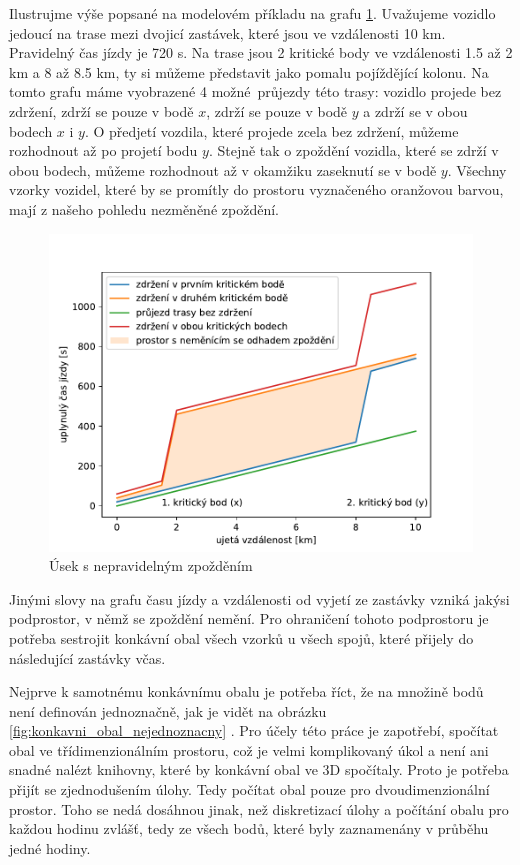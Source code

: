 \bigbreak

Ilustrujme výše popsané na modelovém příkladu na grafu \ref{fig:concave_hull}. Uvažujeme vozidlo jedoucí na trase mezi dvojicí zastávek, které jsou ve vzdálenosti 10 km. Pravidelný čas jízdy je 720 s. Na trase jsou 2 kritické body ve vzdálenosti 1.5 až 2 km a 8 až 8.5 km, ty si můžeme představit jako pomalu pojíždějící kolonu. Na tomto grafu máme vyobrazené 4 možné průjezdy této trasy: vozidlo projede bez zdržení, zdrží se pouze v bodě $x$, zdrží se pouze v bodě $y$ a zdrží se v obou bodech $x$ i $y$. O předjetí vozdila, které projede zcela bez zdržení, můžeme rozhodnout až po projetí bodu $y$. Stejně tak o zpoždění vozidla, které se zdrží v obou bodech, můžeme rozhodnout až v okamžiku zaseknutí se v bodě $y$. Všechny vzorky vozidel, které by se promítly do prostoru vyznačeného oranžovou barvou, mají z našeho pohledu nezměněné zpoždění.


\begin{figure}
\centering
  \includegraphics[width=\linewidth]{../img/concave_hull}
  \caption{Úsek s nepravidelným zpožděním}
  \label{fig:concave_hull}
\end{figure}


\bigbreak


Jinými slovy na grafu času jízdy a vzdálenosti od vyjetí ze zastávky vzniká jakýsi podprostor, v němž se zpoždění nemění. Pro ohraničení tohoto podprostoru je potřeba sestrojit konkávní obal všech vzorků u všech spojů, které přijely do následující zastávky včas.


\bigbreak


Nejprve k samotnému konkávnímu obalu je potřeba říct, že na množině bodů není definován jednoznačně, jak je vidět na obrázku \ref{fig:konkavni_obal_nejednoznacny} \citet{Asaeedi}. Pro účely této práce je zapotřebí, spočítat obal ve třídimenzionálním prostoru, což je velmi komplikovaný úkol a není ani snadné nalézt knihovny, které by konkávní obal ve 3D spočítaly. Proto je potřeba přijít se zjednodušením úlohy. Tedy počítat obal pouze pro dvoudimenzionální prostor. Toho se nedá dosáhnou jinak, než diskretizací úlohy a počítání obalu pro každou hodinu zvlášť, tedy ze všech bodů, které byly zaznamenány v průběhu jedné hodiny.


